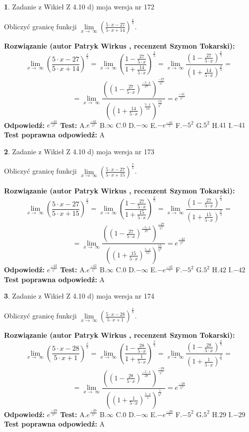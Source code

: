 \documentclass[12pt, a4paper]{article}
\theoremstyle{definition} %
\newtheorem{zad}{}
\newcommand{\zadStart}[1]{\begin{zad}#1\newline}
\newcommand{\zadStop}{\end{zad}}
\newcommand{\rozwStart}[2]{\noindent \textbf{Rozwiązanie (autor #1 , recenzent #2): }\newline}
\newcommand{\rozwStop}{\newline}
\newcommand{\odpStart}{\noindent \textbf{Odpowiedź:}\newline}
\newcommand{\odpStop}{\newline}
\newcommand{\testStart}{\noindent \textbf{Test:}\newline}
\newcommand{\testStop}{\newline}
\newcommand{\kluczStart}{\noindent \textbf{Test poprawna odpowiedź:}\newline}
\newcommand{\kluczStop}{\newline}
\begin{document}
\zadStart{Zadanie z Wikieł Z 4.10 d) moja wersja nr 172}


Obliczyć granicę funkcji  $\lim\limits_{x\to\ \infty}(\frac{5\cdot x-27}{5\cdot x+14})^{\frac{x}{5}}$.
\zadStop
\rozwStart{Patryk Wirkus}{Szymon Tokarski}
$$\lim\limits_{x\to\ \infty}(\frac{5\cdot x-27}{5\cdot x+14})^{\frac{x}{5}} = \lim\limits_{x\to\ \infty}(\frac{1-\frac{27}{5\cdot x}}{1+\frac{14}{5\cdot x}})^{\frac{x}{5}}=\lim\limits_{x\to\ \infty}\frac{(1-\frac{27}{5\cdot x})^{\frac{x}{5}}}{(1+\frac{14}{5\cdot x})^{\frac{x}{5}}}=$$
$$=\lim\limits_{x\to\ \infty}\frac{((1-\frac{27}{5\cdot x})^{\frac{-5\cdot x}{27}})^{\frac{-27}{5^{2}}}}{((1+\frac{14}{5\cdot x})^{\frac{5\cdot x}{14}})^{\frac{14}{5^{2}}}}=e^{\frac{-41}{5^{2}}}$$
\rozwStop
\odpStart
$e^{\frac{-41}{5^{2}}}$
\odpStop
\testStart
A.$e^{\frac{-41}{5^{2}}}$ B.$\infty$ C.$0$ D.$-\infty$ E.$-e^{\frac{-41}{5}}$
F.$-5^{2}$ G.$5^{2}$
H.$41$
I.$-41$
\testStop
\kluczStart
A
\kluczStop



\zadStart{Zadanie z Wikieł Z 4.10 d) moja wersja nr 173}


Obliczyć granicę funkcji  $\lim\limits_{x\to\ \infty}(\frac{5\cdot x-27}{5\cdot x+15})^{\frac{x}{5}}$.
\zadStop
\rozwStart{Patryk Wirkus}{Szymon Tokarski}
$$\lim\limits_{x\to\ \infty}(\frac{5\cdot x-27}{5\cdot x+15})^{\frac{x}{5}} = \lim\limits_{x\to\ \infty}(\frac{1-\frac{27}{5\cdot x}}{1+\frac{15}{5\cdot x}})^{\frac{x}{5}}=\lim\limits_{x\to\ \infty}\frac{(1-\frac{27}{5\cdot x})^{\frac{x}{5}}}{(1+\frac{15}{5\cdot x})^{\frac{x}{5}}}=$$
$$=\lim\limits_{x\to\ \infty}\frac{((1-\frac{27}{5\cdot x})^{\frac{-5\cdot x}{27}})^{\frac{-27}{5^{2}}}}{((1+\frac{15}{5\cdot x})^{\frac{5\cdot x}{15}})^{\frac{15}{5^{2}}}}=e^{\frac{-42}{5^{2}}}$$
\rozwStop
\odpStart
$e^{\frac{-42}{5^{2}}}$
\odpStop
\testStart
A.$e^{\frac{-42}{5^{2}}}$ B.$\infty$ C.$0$ D.$-\infty$ E.$-e^{\frac{-42}{5}}$
F.$-5^{2}$ G.$5^{2}$
H.$42$
I.$-42$
\testStop
\kluczStart
A
\kluczStop



\zadStart{Zadanie z Wikieł Z 4.10 d) moja wersja nr 174}


Obliczyć granicę funkcji  $\lim\limits_{x\to\ \infty}(\frac{5\cdot x-28}{5\cdot x+1})^{\frac{x}{5}}$.
\zadStop
\rozwStart{Patryk Wirkus}{Szymon Tokarski}
$$\lim\limits_{x\to\ \infty}(\frac{5\cdot x-28}{5\cdot x+1})^{\frac{x}{5}} = \lim\limits_{x\to\ \infty}(\frac{1-\frac{28}{5\cdot x}}{1+\frac{1}{5\cdot x}})^{\frac{x}{5}}=\lim\limits_{x\to\ \infty}\frac{(1-\frac{28}{5\cdot x})^{\frac{x}{5}}}{(1+\frac{1}{5\cdot x})^{\frac{x}{5}}}=$$
$$=\lim\limits_{x\to\ \infty}\frac{((1-\frac{28}{5\cdot x})^{\frac{-5\cdot x}{28}})^{\frac{-28}{5^{2}}}}{((1+\frac{1}{5\cdot x})^{\frac{5\cdot x}{1}})^{\frac{1}{5^{2}}}}=e^{\frac{-29}{5^{2}}}$$
\rozwStop
\odpStart
$e^{\frac{-29}{5^{2}}}$
\odpStop
\testStart
A.$e^{\frac{-29}{5^{2}}}$ B.$\infty$ C.$0$ D.$-\infty$ E.$-e^{\frac{-29}{5}}$
F.$-5^{2}$ G.$5^{2}$
H.$29$
I.$-29$
\testStop
\kluczStart
A
\kluczStop
\end{document}
